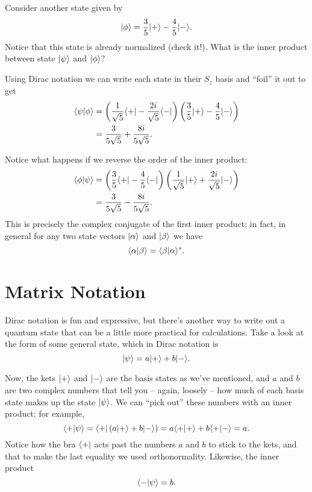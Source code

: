 \begin{example}  Consider another state given by
\begin{equation}
| \phi \rangle = \frac{3}{5} | + \rangle - \frac{4}{5} | - \rangle.
\end{equation}
Notice that this state is already normalized (check it!).  What is the inner product between state $| \psi \rangle$ and $| \phi \rangle$?

Using Dirac notation we can write each state in their $S_z$ basis and ``foil'' it out to get
\begin{align*}
\langle \psi | \phi \rangle & =  \left( \frac{1}{\sqrt{5}}\langle + | - \frac{2i}{\sqrt{5}} \langle - | \right) \left(\frac{3}{5} | + \rangle - \frac{4}{5} | - \rangle \right) \\
& = \frac{3}{5\sqrt{5}} + \frac{8i}{5\sqrt{5}}.
\end{align*}

Notice what happens if we reverse the order of the inner product:
\begin{align*}
\langle \phi | \psi \rangle & =   \left(\frac{3}{5} \langle + | - \frac{4}{5} \langle - | \right) \left( \frac{1}{\sqrt{5}}| + \rangle + \frac{2i}{\sqrt{5}} | - \rangle \right) \\
& = \frac{3}{5\sqrt{5}} - \frac{8i}{5\sqrt{5}}.
\end{align*}
This is precisely the complex conjugate of the first inner product; in fact, in general for any two state vectors $| \alpha \rangle$ and $| \beta \rangle$ we have
\begin{equation}
\langle \alpha | \beta \rangle = \langle \beta | \alpha \rangle^*.
\end{equation}
\end{example}

\section{Matrix Notation}

Dirac notation is fun and expressive, but there's another way to write out a quantum state that can be a little more practical for calculations.  Take a look at the form of some general state, which in Dirac notation is
\begin{equation}
| \psi \rangle = a | + \rangle + b | - \rangle.
\end{equation}

Now, the kets $| + \rangle$ and $| - \rangle$ are the basis states as we've mentioned, and $a$ and $b$ are two complex numbers that tell you -- again, loosely -- how much of each basis state makes up the state $| \psi \rangle$.  We can ``pick out'' these numbers with an inner product; for example,
\[
\langle + | \psi \rangle = \langle + | \left( a | + \rangle + b | - \rangle \right) = a \langle + | + \rangle + b \langle + | - \rangle = a.
\]
Notice how the bra $\langle + |$ acts past the numbers $a$ and $b$ to stick to the kets, and that to make the last equality we used orthonormality. Likewise, the inner product 
\[
\langle - | \psi \rangle = b.
\]

